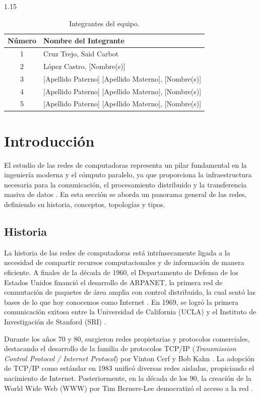 \documentclass[11pt, a4paper]{article}
\begin{document}
\begin{spacing}{1.15}
\vspace{0.4cm}
\begin{table}[H]
    \centering
    \renewcommand{\arraystretch}{1.3}
    \begin{tabular}{|c|p{11cm}|}
        \hline
        \textbf{Número} & \textbf{Nombre del Integrante} \\ \hline
        1 & Cruz Trejo, Said Carbot \\ \hline
        2 & López Castro, [Nombre(s)] \\ \hline
        3 & [Apellido Paterno] [Apellido Materno], [Nombre(s)] \\ \hline
        4 & [Apellido Paterno] [Apellido Materno], [Nombre(s)] \\ \hline
        5 & [Apellido Paterno] [Apellido Materno], [Nombre(s)] \\ \hline
    \end{tabular}
    \caption{Integrantes del equipo.}
\end{table}

\newpage

\section{Introducción}
El estudio de las redes de computadoras representa un pilar fundamental en la ingeniería moderna y el cómputo paralelo, ya que proporciona la infraestructura necesaria para la comunicación, el procesamiento distribuido y la transferencia masiva de datos \cite{kurose2017}. En esta sección se aborda un panorama general de las redes, definiendo su historia, conceptos, topologías y tipos.

\subsection{Historia}
La historia de las redes de computadoras está intrínsecamente ligada a la necesidad de compartir recursos computacionales y de información de manera eficiente. A finales de la década de 1960, el Departamento de Defensa de los Estados Unidos financió el desarrollo de ARPANET, la primera red de conmutación de paquetes de área amplia con control distribuido, la cual sentó las bases de lo que hoy conocemos como Internet \cite{tanenbaum2021}. En 1969, se logró la primera comunicación exitosa entre la Universidad de California (UCLA) y el Instituto de Investigación de Stanford (SRI) \cite{stallings2014}.

Durante los años 70 y 80, surgieron redes propietarias y protocolos comerciales, destacando el desarrollo de la familia de protocolos TCP/IP (\textit{Transmission Control Protocol / Internet Protocol}) por Vinton Cerf y Bob Kahn \cite{kurose2017}. La adopción de TCP/IP como estándar en 1983 unificó diversas redes aisladas, propiciando el nacimiento de Internet. Posteriormente, en la década de los 90, la creación de la World Wide Web (WWW) por Tim Berners-Lee democratizó el acceso a la red \cite{forouzan2013}.


\end{spacing}
\end{document}

